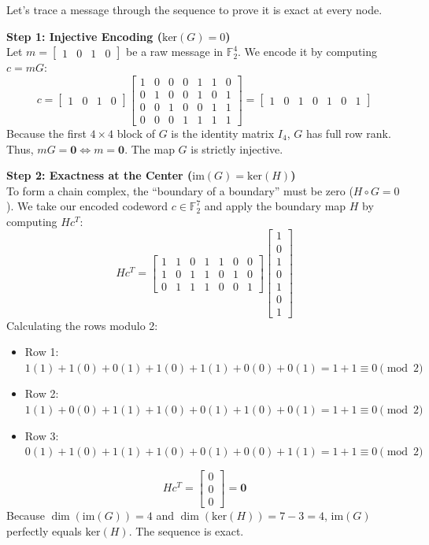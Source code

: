 \documentclass[11pt, a4paper, twoside]{article}
\newcommand{\F}{\mathbb{F}}
\newcommand{\im}{\text{im}}
\newcommand{\kerop}{\text{ker}}
\begin{document}
	\begin{proofbox}
		Let's trace a message through the sequence to prove it is exact at every node.
		
		\textbf{Step 1: Injective Encoding ($\kerop(G) = 0$)}\\
		Let $m = \begin{bmatrix} 1 & 0 & 1 & 0 \end{bmatrix}$ be a raw message in $\F_2^4$. We encode it by computing $c = mG$:
		$$ 
		c = \begin{bmatrix} 1 & 0 & 1 & 0 \end{bmatrix} 
		\begin{bmatrix} 
			1 & 0 & 0 & 0 & 1 & 1 & 0 \\ 
			0 & 1 & 0 & 0 & 1 & 0 & 1 \\ 
			0 & 0 & 1 & 0 & 0 & 1 & 1 \\ 
			0 & 0 & 0 & 1 & 1 & 1 & 1 
		\end{bmatrix}
		= \begin{bmatrix} 1 & 0 & 1 & 0 & 1 & 0 & 1 \end{bmatrix}
		$$
		Because the first $4 \times 4$ block of $G$ is the identity matrix $I_4$, $G$ has full row rank. Thus, $mG = \mathbf{0} \iff m = \mathbf{0}$. The map $G$ is strictly injective.
		
		\vspace{1em}
		\textbf{Step 2: Exactness at the Center ($\im(G) = \kerop(H)$)}\\
		To form a chain complex, the ``boundary of a boundary'' must be zero ($H \circ G = 0$). We take our encoded codeword $c \in \F_2^7$ and apply the boundary map $H$ by computing $Hc^T$:
		$$ 
		Hc^T = \begin{bmatrix} 
			1 & 1 & 0 & 1 & 1 & 0 & 0 \\ 
			1 & 0 & 1 & 1 & 0 & 1 & 0 \\ 
			0 & 1 & 1 & 1 & 0 & 0 & 1 
		\end{bmatrix} 
		\begin{bmatrix} 1 \\ 0 \\ 1 \\ 0 \\ 1 \\ 0 \\ 1 \end{bmatrix}
		$$
		Calculating the rows modulo 2:
		\begin{itemize}
			\item Row 1: $1(1) + 1(0) + 0(1) + 1(0) + 1(1) + 0(0) + 0(1) = 1 + 1 \equiv 0 \pmod 2$
			\item Row 2: $1(1) + 0(0) + 1(1) + 1(0) + 0(1) + 1(0) + 0(1) = 1 + 1 \equiv 0 \pmod 2$
			\item Row 3: $0(1) + 1(0) + 1(1) + 1(0) + 0(1) + 0(0) + 1(1) = 1 + 1 \equiv 0 \pmod 2$
		\end{itemize}
		$$ Hc^T = \begin{bmatrix} 0 \\ 0 \\ 0 \end{bmatrix} = \mathbf{0} $$
		Because $\dim(\im(G)) = 4$ and $\dim(\kerop(H)) = 7 - 3 = 4$, $\im(G)$ perfectly equals $\kerop(H)$. The sequence is exact.
		

\end{proofbox}
\end{document}
